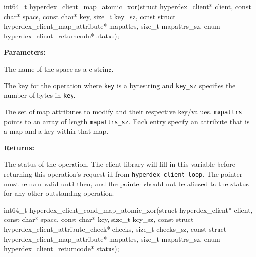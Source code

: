 \funcsep
\begin{ccode}
int64_t hyperdex_client_map_atomic_xor(struct hyperdex_client* client,
                const char* space,
                const char* key, size_t key_sz,
                const struct hyperdex_client_map_attribute* mapattrs, size_t mapattrs_sz,
                enum hyperdex_client_returncode* status);
\end{ccode}
\funcdesc 

\noindent\textbf{Parameters:}
\begin{description}[labelindent=\widthof{{\texttt{mapattrs}, \texttt{mapattrs\_sz}}},leftmargin=*,noitemsep,nolistsep,align=right]
\item[\texttt{space}] The name of the space as a c-string.
\item[\texttt{key}, \texttt{key\_sz}] The key for the operation where \texttt{key} is a bytestring and \texttt{key\_sz} specifies the number of bytes in \texttt{key}.
\item[\texttt{mapattrs}, \texttt{mapattrs\_sz}] The set of map attributes to modify and their respective key/values.  \texttt{mapattrs} points to an array of length \texttt{mapattrs\_sz}.  Each entry specify an attribute that is a map and a key within that map.
\end{description}

\noindent\textbf{Returns:}
\begin{description}[labelindent=\widthof{{\texttt{status}}},leftmargin=*,noitemsep,nolistsep,align=right]
\item[\texttt{status}] The status of the operation.  The client library will fill in this variable before returning this operation's request id from \texttt{hyperdex\_client\_loop}.  The pointer must remain valid until then, and the pointer should not be aliased to the status for any other outstanding operation.
\end{description}

\funcsep
\begin{ccode}
int64_t hyperdex_client_cond_map_atomic_xor(struct hyperdex_client* client,
                const char* space,
                const char* key, size_t key_sz,
                const struct hyperdex_client_attribute_check* checks, size_t checks_sz,
                const struct hyperdex_client_map_attribute* mapattrs, size_t mapattrs_sz,
                enum hyperdex_client_returncode* status);
\end{ccode}
\funcdesc 

